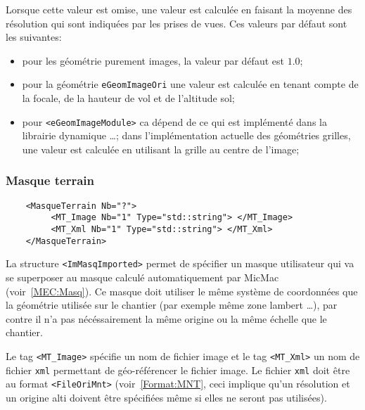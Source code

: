 Lorsque cette valeur  est omise, une valeur est calcul\'ee en
faisant la moyenne des r\'esolution qui sont indiqu\'ees
par les prises de vues. Ces valeurs par d\'efaut sont les suivantes:

\begin{itemize}
   \item pour les g\'eom\'etrie  purement images, la valeur
         par d\'efaut est $1.0$;

   \item pour  la g\'eom\'etrie  {\tt eGeomImageOri} une 
         valeur est calcul\'ee en tenant compte de la focale, de la
         hauteur de vol et de l'altitude sol;

    \item pour {\tt <eGeomImageModule>} ca d\'epend de ce qui est impl\'ement\'e
          dans la librairie dynamique \dots  ; dans l'impl\'ementation
         actuelle des g\'eom\'etries grilles, une valeur est 
         calcul\'ee en utilisant la grille au centre de l'image;
\end{itemize}



\subsubsection{Masque terrain}

\begin{verbatim}
    <MasqueTerrain Nb="?">
         <MT_Image Nb="1" Type="std::string"> </MT_Image>
         <MT_Xml Nb="1" Type="std::string"> </MT_Xml>
    </MasqueTerrain>
\end{verbatim}


\label{Masq:Ter:Util}

La structure {\tt <ImMasqImported>} permet de sp\'ecifier un masque 
utilisateur qui va se superposer au masque calcul\'e automatiquement
par MicMac (voir~\ref{MEC:Masq}). Ce masque doit utiliser le m\^eme
syst\`eme de coordonn\'ees que la g\'eom\'etrie utilis\'ee sur
le chantier (par exemple m\^eme zone lambert \dots), par
contre il n'a pas n\'ec\'essairement la m\^eme origine ou
la m\^eme \'echelle que le chantier.

Le tag {\tt <MT\_Image>} sp\'ecifie un nom de fichier image
et le tag {\tt <MT\_Xml>} un nom de fichier {\tt xml} permettant
de g\'eo-r\'ef\'erencer le fichier image. Le fichier  {\tt xml} 
doit \^etre au format {\tt <FileOriMnt>} (voir~\ref{Format:MNT},
ceci implique qu'un r\'esolution et un origine alti doivent \^etre
sp\'ecifi\'ees m\^eme si elles ne seront pas utilis\'ees).

